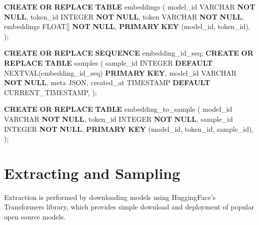 \documentclass[
  a4paper, twoside, 10pt, titlepage]{book}
\newenvironment{Shaded}{}{}
\newcommand{\DataTypeTok}[1]{\textcolor[rgb]{0.56,0.13,0.00}{#1}}
\newcommand{\FunctionTok}[1]{\textcolor[rgb]{0.02,0.16,0.49}{#1}}
\newcommand{\KeywordTok}[1]{\textcolor[rgb]{0.00,0.44,0.13}{\textbf{#1}}}
\newcommand{\NormalTok}[1]{#1}
\newcommand{\StringTok}[1]{\textcolor[rgb]{0.25,0.44,0.63}{#1}}
\begin{document}
\begin{Shaded}
\begin{Highlighting}[]
\KeywordTok{CREATE} \KeywordTok{OR} \KeywordTok{REPLACE} \KeywordTok{TABLE}\NormalTok{ embeddings (}
\NormalTok{    model\_id }\DataTypeTok{VARCHAR} \KeywordTok{NOT} \KeywordTok{NULL}\NormalTok{,}
\NormalTok{    token\_id }\DataTypeTok{INTEGER} \KeywordTok{NOT} \KeywordTok{NULL}\NormalTok{,}
\NormalTok{    token }\DataTypeTok{VARCHAR} \KeywordTok{NOT} \KeywordTok{NULL}\NormalTok{,}
\NormalTok{    embeddings }\DataTypeTok{FLOAT}\NormalTok{[] }\KeywordTok{NOT} \KeywordTok{NULL}\NormalTok{,}
    \KeywordTok{PRIMARY} \KeywordTok{KEY}\NormalTok{ (model\_id, token\_id),}
\NormalTok{);}

\KeywordTok{CREATE} \KeywordTok{OR} \KeywordTok{REPLACE} \KeywordTok{SEQUENCE}\NormalTok{ embedding\_id\_seq;}
\KeywordTok{CREATE} \KeywordTok{OR} \KeywordTok{REPLACE} \KeywordTok{TABLE}\NormalTok{ samples (}
\NormalTok{    sample\_id }\DataTypeTok{INTEGER} \KeywordTok{DEFAULT}\NormalTok{ NEXTVAL(}\StringTok{\textquotesingle{}embedding\_id\_seq\textquotesingle{}}\NormalTok{) }\KeywordTok{PRIMARY} \KeywordTok{KEY}\NormalTok{,}
\NormalTok{    model\_id }\DataTypeTok{VARCHAR} \KeywordTok{NOT} \KeywordTok{NULL}\NormalTok{,}
\NormalTok{    meta JSON,}
\NormalTok{    created\_at }\DataTypeTok{TIMESTAMP} \KeywordTok{DEFAULT} \FunctionTok{CURRENT\_TIMESTAMP}\NormalTok{,}
\NormalTok{);}

\KeywordTok{CREATE} \KeywordTok{OR} \KeywordTok{REPLACE} \KeywordTok{TABLE}\NormalTok{ embedding\_to\_sample (}
\NormalTok{    model\_id }\DataTypeTok{VARCHAR} \KeywordTok{NOT} \KeywordTok{NULL}\NormalTok{,}
\NormalTok{    token\_id }\DataTypeTok{INTEGER} \KeywordTok{NOT} \KeywordTok{NULL}\NormalTok{,}
\NormalTok{    sample\_id }\DataTypeTok{INTEGER} \KeywordTok{NOT} \KeywordTok{NULL}\NormalTok{,}
    \KeywordTok{PRIMARY} \KeywordTok{KEY}\NormalTok{ (model\_id, token\_id, sample\_id),}
\NormalTok{);}
\end{Highlighting}
\end{Shaded}

\section{Extracting and Sampling}\label{extracting-and-sampling}

Extraction is performed by downloading models using HuggingFace's
Transformers library, which provides simple download and deployment of
popular open source models.
\end{document}
